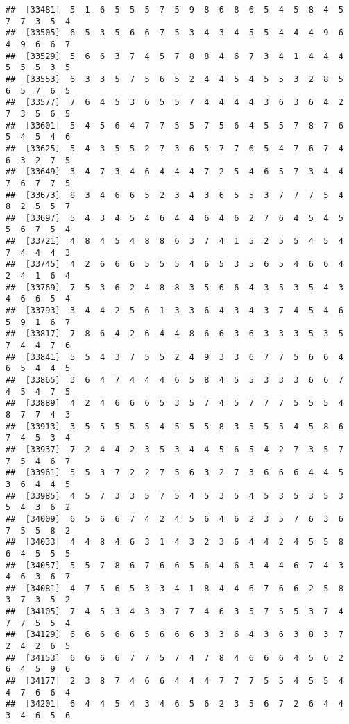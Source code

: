 \documentclass[
]{book}
\begin{document}
\begin{verbatim}
##  [33481]  5  1  6  5  5  5  7  5  9  8  6  8  6  5  4  5  8  4  5  7  7  3  5  4
##  [33505]  6  5  3  5  6  6  7  5  3  4  3  4  5  5  4  4  4  9  6  4  9  6  6  7
##  [33529]  5  6  6  3  7  4  5  7  8  8  4  6  7  3  4  1  4  4  4  5  5  5  3  5
##  [33553]  6  3  3  5  7  5  6  5  2  4  4  5  4  5  5  3  2  8  5  6  5  7  6  5
##  [33577]  7  6  4  5  3  6  5  5  7  4  4  4  4  3  6  3  6  4  2  7  3  5  6  5
##  [33601]  5  4  5  6  4  7  7  5  5  7  5  6  4  5  5  7  8  7  6  5  4  5  4  6
##  [33625]  5  4  3  5  5  2  7  3  6  5  7  7  6  5  4  7  6  7  4  6  3  2  7  5
##  [33649]  3  4  7  3  4  6  4  4  4  7  2  5  4  6  5  7  3  4  4  7  6  7  7  5
##  [33673]  8  3  4  6  6  5  2  3  4  3  6  5  5  3  7  7  7  5  4  8  2  5  5  7
##  [33697]  5  4  3  4  5  4  6  4  4  6  4  6  2  7  6  4  5  4  5  5  6  7  5  4
##  [33721]  4  8  4  5  4  8  8  6  3  7  4  1  5  2  5  5  4  5  4  7  4  4  4  3
##  [33745]  4  2  6  6  6  5  5  5  4  6  5  3  5  6  5  4  6  6  4  2  4  1  6  4
##  [33769]  7  5  3  6  2  4  8  8  3  5  6  6  4  3  5  3  5  4  3  4  6  6  5  4
##  [33793]  3  4  4  2  5  6  1  3  3  6  4  3  4  3  7  4  5  4  6  5  9  1  6  7
##  [33817]  7  8  6  4  2  6  4  4  8  6  6  3  6  3  3  3  5  3  5  7  4  4  7  6
##  [33841]  5  5  4  3  7  5  5  2  4  9  3  3  6  7  7  5  6  6  4  6  5  4  4  5
##  [33865]  3  6  4  7  4  4  4  6  5  8  4  5  5  3  3  3  6  6  7  4  5  4  7  5
##  [33889]  4  2  4  6  6  6  5  3  5  7  4  5  7  7  7  5  5  5  4  8  7  7  4  3
##  [33913]  3  5  5  5  5  5  4  5  5  5  8  3  5  5  5  4  5  8  6  7  4  5  3  4
##  [33937]  7  2  4  4  2  3  5  3  4  4  5  6  5  4  2  7  3  5  7  7  5  4  6  7
##  [33961]  5  5  3  7  2  2  7  5  6  3  2  7  3  6  6  6  4  4  5  3  6  4  4  5
##  [33985]  4  5  7  3  3  5  7  5  4  5  3  5  4  5  3  5  3  5  3  5  4  3  6  2
##  [34009]  6  5  6  6  7  4  2  4  5  6  4  6  2  3  5  7  6  3  6  7  5  5  8  2
##  [34033]  4  4  8  4  6  3  1  4  3  2  3  6  4  4  2  4  5  5  8  6  4  5  5  5
##  [34057]  5  5  7  8  6  7  6  6  5  6  4  6  3  4  4  6  7  4  3  4  6  3  6  7
##  [34081]  4  7  5  6  5  3  3  4  1  8  4  4  6  7  6  6  2  5  8  3  7  3  5  2
##  [34105]  7  4  5  3  4  3  3  7  7  4  6  3  5  7  5  5  3  7  4  7  7  5  5  4
##  [34129]  6  6  6  6  6  5  6  6  6  3  3  6  4  3  6  3  8  3  7  2  4  2  6  5
##  [34153]  6  6  6  6  7  7  5  7  4  7  8  4  6  6  6  4  5  6  2  6  4  5  9  6
##  [34177]  2  3  8  7  4  6  6  4  4  4  7  7  7  5  5  4  5  5  4  4  7  6  6  4
##  [34201]  6  4  4  5  4  3  4  6  5  6  2  3  5  6  7  2  6  4  4  3  4  6  5  6

\end{verbatim}
\end{document}
